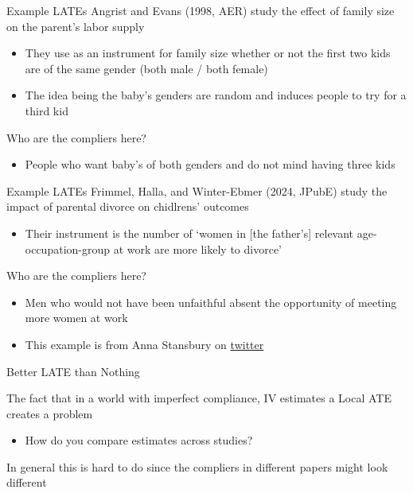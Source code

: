 \documentclass[aspectratio=169,t,11pt,table]{beamer}
\begin{document}
\begin{frame}{Example LATEs}
  Angrist and Evans (1998, AER) study the effect of family size on the parent's labor supply
  \begin{itemize}
    \item They use as an instrument for family size whether or not the first two kids are of the same gender (both male / both female)
    
    \item The idea being the baby's genders are random and induces people to try for a third kid
  \end{itemize}

  \bigskip
  Who are the compliers here?
  \pause
  \begin{itemize}
    \item People who want baby's of both genders and do not mind having three kids
  \end{itemize}
\end{frame}

\begin{frame}{Example LATEs}
  Frimmel, Halla, and Winter-Ebmer (2024, JPubE) study the impact of parental divorce on chidlrens' outcomes
  \begin{itemize}
    \item Their instrument is the number of `women in [the father's] relevant age-occupation-group at work are more likely to divorce'
  \end{itemize}

  \bigskip
  Who are the compliers here?
  \pause
  \begin{itemize}
    \item Men who would not have been unfaithful absent the opportunity of meeting more women at work

    \item This example is from Anna Stansbury on \href{https://x.com/annastansbury/status/1841189989163372870}{twitter}
  \end{itemize}
\end{frame}



\begin{frame}{Better LATE than Nothing}

  The fact that in a world with imperfect compliance, IV estimates a Local ATE creates a problem
  \begin{itemize}
    \item How do you compare estimates across studies?
  \end{itemize}
  
  \bigskip
  In general this is hard to do since the compliers in different papers might look different
\end{frame}
\end{document}
